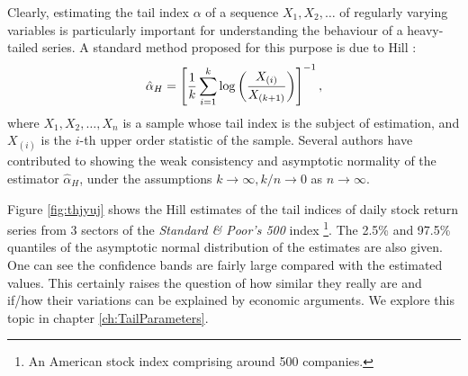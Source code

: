 Clearly, estimating the tail index $\alpha$ of a sequence
$X_1, X_2, \dots$ of regularly varying variables is particularly
important for understanding the behaviour of a heavy-tailed series. A
standard method proposed for this purpose is due to Hill
\cite{hill1975simple}:
\begin{equation}
  \label{eq:fhhty}
  \hat \alpha_H = \left[
    {1 \over k} \sum_{i=1}^k \log \left(
      X_{(i)} \over X_{(k+1)}
    \right)
  \right]^{-1},
\end{equation}
where $X_1, X_2, \dots, X_n$ is a sample whose tail index is the
subject of estimation, and $X_{(i)}$ is the $i$-th upper order
statistic of the sample. Several authors have contributed to showing
the weak consistency and asymptotic normality of the estimator
$\hat \alpha_H$, under the assumptions $k \to \infty, k/n \to 0$
as $n \to \infty$.


Figure \ref{fig:thjyuj} shows the Hill estimates of the tail indices
of daily stock return series from 3 sectors of the
{\em Standard \& Poor's 500} index \footnote{An American stock index
  comprising around 500 companies.}. The 2.5\% and 97.5\% quantiles of
the asymptotic normal distribution of the estimates are also
given. One can see the confidence bands are fairly large compared with
the estimated values. This certainly raises the question of how
similar they really are and if/how their variations can be explained by
economic arguments. We explore this topic in chapter
\ref{ch:TailParameters}.

